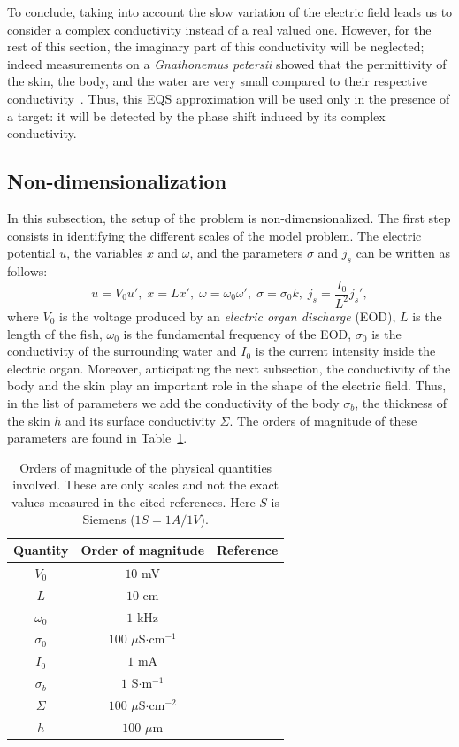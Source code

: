 \documentclass[final]{siamltex}
\numberwithin{equation}{section}
\numberwithin{figure}{section}
\numberwithin{table}{section}
\begin{document}
To conclude, taking into account the slow variation of the
electric field leads us to consider a complex conductivity instead
of a real valued one. However, for the rest of this section, the
imaginary part of this conductivity will be neglected; indeed
measurements on a \emph{Gnathonemus petersii} showed that the
permittivity of the skin, the body, and the water are very small
compared to their respective
conductivity~\cite{caputi1998electric,scheich1973coding}. Thus,
this EQS approximation will be used only in the presence of a
target: it will be detected by the phase shift induced by its
complex conductivity.


\subsection{Non-dimensionalization} \label{nondimension}
In this subsection, the setup of the problem is
non-dimensionalized. The first step consists in identifying the
different scales of the model problem. The electric potential $u$,
the variables $x$ and $\omega$, and the parameters $\sigma$ and
${j_{s}}$ can be written as follows:
\[
u=V_{0}u',\;
x=Lx',\;\omega=\omega_{0}\omega',\;\sigma=\sigma_{0}k,\;
{j_{s}}=\frac{I_{0}}{L^{2}} {j_{s}'},
\]
 where $V_{0}$ is the voltage produced by an \emph{electric organ
discharge} (EOD), $L$ is the length of the fish, $\omega_{0}$ is
the fundamental frequency of the EOD, $\sigma_{0}$ is the
conductivity of the surrounding water and $I_{0}$ is the current
intensity inside the electric organ. Moreover, anticipating the
next subsection, the conductivity of the body and the skin play an
important role in the shape of the electric field. Thus, in the
list of parameters we add the conductivity of the body
$\sigma_{b}$, the thickness of the skin $h$ and its surface
conductivity $\Sigma$. The orders of magnitude of these parameters
are found in Table~\ref{tab:Orders-of-magnitude}.

\begin{table}[!h]
\centering%
\begin{tabular}{|c|c|c|}
\hline
Quantity  & Order of magnitude  & Reference\tabularnewline
\hline
\hline
$V_{0}$  & $10$ mV  & \cite{assad1998electric,stoddard1999electric}\tabularnewline
\hline
$L$  & $10$ cm  & \cite{moller1995}\tabularnewline
\hline
$\omega_{0}$  & $1$ kHz  & \cite{moller1995}\tabularnewline
\hline
$\sigma_{0}$  & $100$ $\mu$S$\cdot$cm$^{-1}$  & \cite{maciver2001prey}\tabularnewline
\hline
$I_{0}$  & $1$ mA  & \cite{bell1976electric}\tabularnewline
\hline
$\sigma_{b}$  & $1$ S$\cdot$m$^{-1}$  & \cite{scheich1973coding}\tabularnewline
\hline
$\Sigma$  & $100$ $\mu$S$\cdot$cm$^{-2}$  & \cite{caputi1998electric}\tabularnewline
\hline
$h$  & $100$ $\mu$m  & \cite{zakon1986electroreceptive}\tabularnewline
\hline
\end{tabular}

\caption{\label{tab:Orders-of-magnitude}Orders of magnitude of the
physical quantities involved. These are only scales and not the
exact values measured in the cited references. Here $S$ is Siemens
($1S =1A/1V$).}
\end{table}
\end{document}
